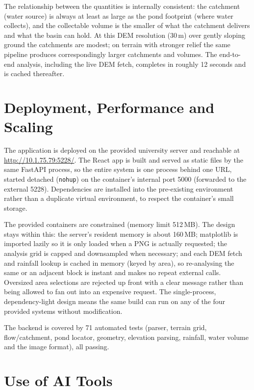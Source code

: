 \documentclass[11pt]{article}
\begin{document}
The relationship between the quantities is internally consistent: the catchment
(water source) is always at least as large as the pond footprint (where water
collects), and the collectable volume is the smaller of what the catchment delivers
and what the basin can hold. At this DEM resolution (30\,m) over gently sloping ground
the catchments are modest; on terrain with stronger relief the same pipeline produces
correspondingly larger catchments and volumes. The end-to-end analysis, including the
live DEM fetch, completes in roughly 12 seconds and is cached thereafter.

\section{Deployment, Performance and Scaling}

The application is deployed on the provided university server and reachable at
\url{http://10.1.75.79:5228/}. The React app is built and served as static files by
the same FastAPI process, so the entire system is one process behind one URL, started
detached (\texttt{nohup}) on the container's internal port 5000 (forwarded to the
external 5228). Dependencies are installed into the pre-existing environment rather
than a duplicate virtual environment, to respect the container's small storage.

The provided containers are constrained (memory limit 512\,MB). The design stays
within this: the server's resident memory is about 160\,MB; matplotlib is imported
lazily so it is only loaded when a PNG is actually requested; the analysis grid is
capped and downsampled when necessary; and each DEM fetch and rainfall lookup is
cached in memory (keyed by area), so re-analysing the same or an adjacent block is
instant and makes no repeat external calls. Oversized area selections are rejected up
front with a clear message rather than being allowed to fan out into an expensive
request. The single-process, dependency-light design means the same build can run on
any of the four provided systems without modification.

The backend is covered by 71 automated tests (parser, terrain grid, flow/catchment,
pond locator, geometry, elevation parsing, rainfall, water volume and the image
format), all passing.

\section{Use of AI Tools}
\end{document}
